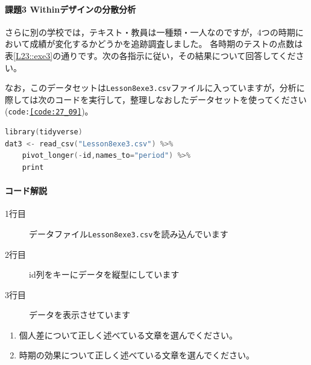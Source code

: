 \documentclass{ltjsarticle}
\begin{document}
\paragraph{課題3 Withinデザインの分散分析}
さらに別の学校では，テキスト・教員は一種類・一人なのですが，4つの時期において成績が変化するかどうかを追跡調査しました。
各時期のテストの点数は表\ref{L23::exe3}の通りです。次の各指示に従い，その結果について回答してください。

なお，このデータセットは\texttt{Lesson8exe3.csv}ファイルに入っていますが，分析に際しては次のコードを実行して，整理しなおしたデータセットを使ってください(\texttt{code:\ref{code:27_09}})。
\begin{lstlisting}[language=c++,label={code:27_09},caption={データを外部ファイルから読み込んで実行する}]
library(tidyverse)
dat3 <- read_csv("Lesson8exe3.csv") %>% 
    pivot_longer(-id,names_to="period") %>% 
    print
\end{lstlisting}
\paragraph{コード解説}
\begin{description}
	\item[1行目] データファイル\texttt{Lesson8exe3.csv}を読み込んでいます
	\item[2行目] id列をキーにデータを縦型にしています
	\item[3行目] データを表示させています
\end{description}
\begin{enumerate}
	\item 個人差について正しく述べている文章を選んでください。
	\item 時期の効果について正しく述べている文章を選んでください。
\end{enumerate}
\end{document}
